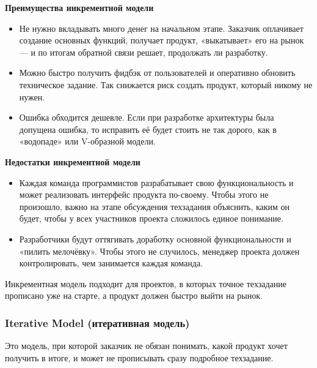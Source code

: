 \documentclass[a4paper]{article}
\begin{document}
\noindent\textbf{Преимущества инкрементной модели}
\begin{itemize}
  \item    Не нужно вкладывать много денег на начальном этапе. Заказчик оплачивает создание основных функций, получает продукт, «выкатывает» его на рынок — и по итогам обратной связи решает, продолжать ли разработку.
  \item Можно быстро получить фидбэк от пользователей и оперативно обновить техническое задание. Так снижается риск создать продукт, который никому не нужен.
  \item Ошибка обходится дешевле. Если при разработке архитектуры была допущена ошибка, то исправить её будет стоить не так дорого, как в «водопаде» или V-образной модели.
\end{itemize}
\noindent\textbf{Недостатки инкрементной модели}
\begin{itemize}
  \item Каждая команда программистов разрабатывает свою функциональность и может реализовать интерфейс продукта по-своему. Чтобы этого не произошло, важно на этапе обсуждения техзадания объяснить, каким он будет, чтобы у всех участников проекта сложилось единое понимание.
  \item Разработчики будут оттягивать доработку основной функциональности и «пилить мелочёвку». Чтобы этого не случилось, менеджер проекта должен контролировать, чем занимается каждая команда.
\end{itemize}

Инкрементная модель подходит для проектов, в которых точное техзадание прописано уже на старте, а продукт должен быстро выйти на рынок.

\subsubsection{Iterative Model (итеративная модель)}

Это модель, при которой заказчик не обязан понимать, какой продукт хочет получить в итоге, и может не прописывать сразу подробное техзадание.
\end{document}
